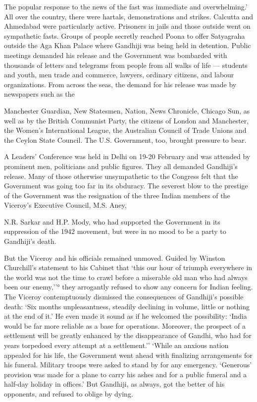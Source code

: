 \begin{multicols}{2}
The popular response to the news of the fast was immediate and overwhelming.' All over the country, there were hartals, demonstrations and strikes. Calcutta and Ahmedabad were particularly active. Prisoners in jails and those outside went on sympathetic fasts. Groups of people secretly reached Poona to offer Satyagraha outside the Aga Khan Palace where Gandhiji was being held in detention. Public meetings demanded his release and the Government was bombarded with thousands of letters and telegrams from people from all walks of life --- students and youth, men trade and commerce, lawyers, ordinary citizens, and labour organizations. From across the seas, the demand for his release was made by newspapers such as the

Manchester Guardian, New Statesmen, Nation, News Chronicle, Chicago Sun, as well as by the British Communist Party, the citizens of London and Manchester, the Women's International League, the Australian Council of Trade Unions and the Ceylon State Council. The U.S. Government, too, brought pressure to bear.

A Leaders' Conference was held in Delhi on 19-20 February and was attended by prominent men, politicians and public figures. They all demanded Gandhiji's release. Many of those otherwise unsympathetic to the Congress felt that the Government was going too far in its obduracy. The severest blow to the prestige of the Government was the resignation of the three Indian members of the Viceroy's Executive Council, M.S. Aney,

N.R. Sarkar and H.P. Mody, who had supported the Government in its suppression of the 1942 movement, but were in no mood to be a party to Gandhiji's death.

But the Viceroy and his officials remained unmoved. Guided by Winston Churchill's statement to his Cabinet that `this our hour of triumph everywhere in the world was not the time to crawl before a miserable old man who had always been our enemy,''° they arrogantly refused to show any concern for Indian feeling. The Viceroy contemptuously dismissed the consequences of Gandhiji's possible death: `Six months unpleasantness, steadily declining in volume, little or nothing at the end of it.' He even made it sound as if he welcomed the possibility: `India would be far more reliable as a base for operations. Moreover, the prospect of a settlement will be greatly enhanced by the disappearance of Gandhi, who had for years torpedoed every attempt at a settlement.'' `While an anxious nation appealed for his life, the Government went ahead with finalizing arrangements for his funeral. Military troops were asked to stand by for any emergency. `Generous' provision was made for a plane to carry his ashes and for a public funeral and a half-day holiday in offices.' But Gandhiji, as always, got the better of his opponents, and refused to oblige by dying.


\end{multicols}

